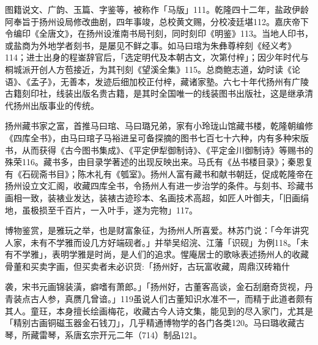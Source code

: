 \noindent 图籍说文、广韵、玉篇、字鉴等，被称作「马版」111。乾隆四十二年，盐政伊龄阿奉旨于扬州设局修改曲剧，四年事竣，总校黄文赐，分校凌廷堪112。嘉庆帝下令编印《全唐文》，在扬州设淮南书局刊刻，同时刻印《明鉴》113。当地人印书，或盐商为外地学者刻书，是屡见不鲜之事。如马曰琯为朱彝尊梓刻《经义考》114；进士出身的程崟辞官后，「选定明代及本朝古文，次第付梓」；因少年时代与桐城派开创人方苞接近，为其刊刻《望溪全集》115。总商鲍志道，幼时读《论语》、《孟子》，无善本，发迹后细加校正付梓，藏诸家塾。六七十年代扬州有广陵古籍刻印社，线装出版名贵古籍，是其时全国唯一的线装图书出版社，这是继承清代扬州出版事业的传统。

扬州藏书家之富，首推马曰琯、马曰璐兄弟，家有小玲珑山馆藏书楼，乾隆朝编修《四库全书》，由马曰琯子马裕进呈可备探摘的图书七百七十六种，内有多种宋版书，从而获得《古今图书集成》、《平定伊犁御制诗》、《平定金川御制诗》等赐书的殊荣116。藏书多，由目录学著述的出现反映出来。马氏有《丛书楼目录》；秦恩复有《石砚斋书目》；陈木礼有《瓠室》。扬州人富有藏书和献书朝廷，促成乾隆帝在扬州设立文汇阁，收藏四库全书，令扬州人有进一步治学的条件。与刻书、珍藏书画相一致，装裱业发达，装裱古迹珍本、名画技术高超，如匠人叶御夫，「旧画绢地，虽极损至千百片，一入叶手，遂为完物」117。

博物鉴赏，是雅玩之举，也是财富象征，为扬州人所喜爱。林苏门说：「今年讲究人家，未有不学雅而设几方好端砚者。」并举吴绍浣、江藩「识砚」为例118。「未有不学雅」，表明学雅是时尚，是人们的追求。惺庵居士的歌咏表述扬州人的收藏骨董和买卖字画，但买卖者未必识货:「扬州好，古玩富收藏，周鼎汉砖箱什

\vfill
\begin{BookNotes}
\end{BookNotes}

\noindent 袭，宋书元画锦装潢，癖嗜有萧郎。」「扬州好，古董客高谈，金石刮磨奇货视，丹青装点古人参，真赝几曾谙。」119虽说人们古董知识水准不一，而精于此道者颇有其人。童玨，本身擅长绘画梅花，收藏古今人诗文集，能见到的尽入家门，尤其是「精别古画铜磁玉器金石钱刀」，几乎精通博物学的各门各类120。马曰璐收藏古琴，所藏雷琴，系唐玄宗开元二年（714）制品121。

